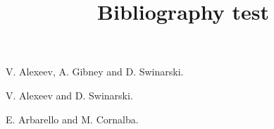 \documentclass{amsart}
\title{Bibliography test}
\begin{document}
\maketitle

\cite{AGS}

\cite{AGS,AS}

\cite{XXX}

\cite{AGS,AS,AC}

\cite[section 5]{AC}

\begin{thebibliography}{GKM02}

 V. Alexeev, A. Gibney and D. Swinarski.  

 V. Alexeev and D. Swinarski. 

 E. Arbarello and M. Cornalba. 

\end{thebibliography}

\cite{AGS,AS,AC}
\end{document}
